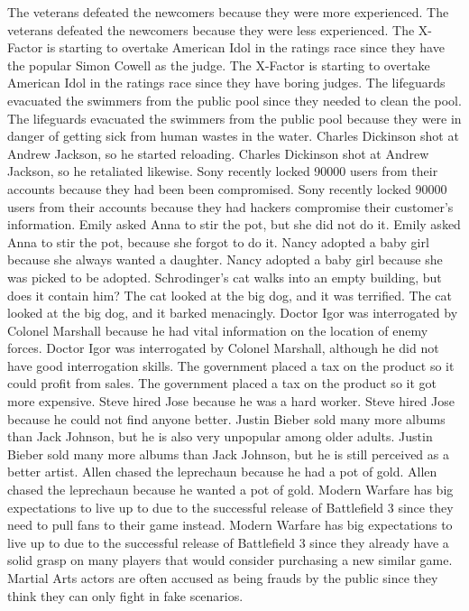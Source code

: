 \documentclass{article}
\begin{document}
\begin{enumerate}
	The veterans defeated the newcomers because they were more experienced.
	The veterans defeated the newcomers because they were less experienced.
	The X-Factor is starting to overtake American Idol in the ratings race since they have the popular Simon Cowell as the judge.
	The X-Factor is starting to overtake American Idol in the ratings race since they have boring judges.
	The lifeguards evacuated the swimmers from the public pool since they needed to clean the pool.
	The lifeguards evacuated the swimmers from the public pool because they were in danger of getting sick from human wastes in the water.
	Charles Dickinson shot at Andrew Jackson, so he started reloading.
	Charles Dickinson shot at Andrew Jackson, so he retaliated likewise.
	Sony recently locked 90000 users from their accounts because they had been been compromised.
	Sony recently locked 90000 users from their accounts because they had hackers compromise their customer's information.
	Emily asked Anna to stir the pot, but she did not do it.
	Emily asked Anna to stir the pot, because she forgot to do it.
	Nancy adopted a baby girl because she always wanted a daughter.
	Nancy adopted a baby girl because she was picked to be adopted.
	Schrodinger's cat walks into an empty building, but does it contain him?
	The cat looked at the big dog, and it was terrified.
	The cat looked at the big dog, and it barked menacingly.
	Doctor Igor was interrogated by Colonel Marshall because he had vital information on the location of enemy forces.
	Doctor Igor was interrogated by Colonel Marshall, although he did not have good interrogation skills.
	The government placed a tax on the product so it could profit from sales.
	The government placed a tax on the product so it got more expensive.
	Steve hired Jose because he was a hard worker.
	Steve hired Jose because he could not find anyone better.
	Justin Bieber sold many more albums than Jack Johnson, but he is also very unpopular among older adults.
	Justin Bieber sold many more albums than Jack Johnson, but he is still perceived as a better artist.
	Allen chased the leprechaun because he had a pot of gold.
	Allen chased the leprechaun because he wanted a pot of gold.
	Modern Warfare has big expectations to live up to due to the successful release of Battlefield 3 since they need to pull fans to their game instead.
	Modern Warfare has big expectations to live up to due to the successful release of Battlefield 3 since they already have a solid grasp on many players that would consider purchasing a new similar game.
	Martial Arts actors are often accused as being frauds by the public since they think they can only fight in fake scenarios.

\end{enumerate}
\end{document}
